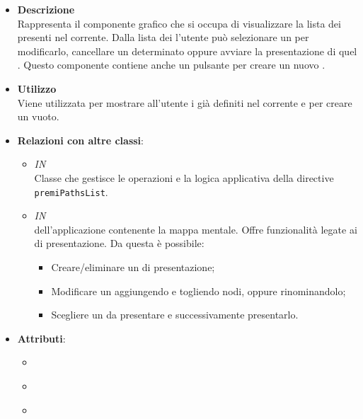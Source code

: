 \begin{itemize}
\item \textbf{Descrizione}\\
Rappresenta il componente grafico che si occupa di visualizzare la lista dei  presenti nel  corrente. Dalla lista dei  l'utente può selezionare un  per modificarlo, cancellare un determinato  oppure avviare la presentazione di quel . Questo componente contiene anche un pulsante per creare un nuovo .
\item \textbf{Utilizzo}\\
Viene utilizzata per mostrare all’utente i  già definiti nel  corrente e per creare un  vuoto.
\item \textbf{Relazioni con altre classi}:
\begin{itemize}
\item \textit{IN} \hyperref[\nogloxy{Premi::Front-End::Controllers::PathsListController}]{}\\
Classe che gestisce le operazioni e la logica applicativa della directive \texttt{premiPathsList}.
\item \textit{IN} \hyperref[\nogloxy{Premi::Front-End::Views::PathsEditorView}]{}\\
 dell’applicazione contenente la mappa mentale. Offre funzionalità legate ai  di presentazione.
Da questa  è possibile:
\begin{itemize}
\item Creare/eliminare un  di presentazione;
\item Modificare un  aggiungendo e togliendo nodi, oppure rinominandolo;
\item Scegliere un  da presentare e successivamente presentarlo.
\end{itemize}
\end{itemize}
\item \textbf{Attributi}:
\begin{itemize}
\item {}
\\ \dpDirectiveController
\item {}
\\ \dpRestrict
\item {}

\end{itemize}
\end{itemize}
